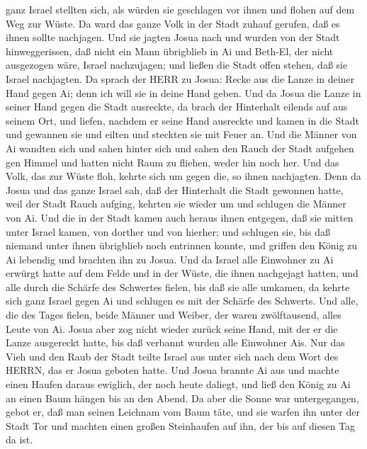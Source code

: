 ganz Israel stellten sich, als würden sie geschlagen vor ihnen und
flohen auf dem Weg zur Wüste.  Da ward das ganze Volk in
der Stadt zuhauf gerufen, daß es ihnen sollte nachjagen. 
Und sie jagten Josua nach und wurden von der Stadt hinweggerissen, daß
nicht ein Mann übrigblieb in Ai und Beth-El, der nicht ausgezogen wäre,
Israel nachzujagen; und ließen die Stadt offen stehen, daß sie Israel
nachjagten.  Da sprach der HERR zu Josua: Recke aus die
Lanze in deiner Hand gegen Ai; denn ich will sie in deine Hand geben.
Und da Josua die Lanze in seiner Hand gegen die Stadt ausreckte,
 da brach der Hinterhalt eilends auf aus seinem Ort, und
liefen, nachdem er seine Hand ausreckte und kamen in die Stadt und
gewannen sie und eilten und steckten sie mit Feuer an.  Und
die Männer von Ai wandten sich und sahen hinter sich und sahen den Rauch
der Stadt aufgehen gen Himmel und hatten nicht Raum zu fliehen, weder
hin noch her. Und das Volk, das zur Wüste floh, kehrte sich um gegen
die, so ihnen nachjagten.  Denn da Josua und das ganze
Israel sah, daß der Hinterhalt die Stadt gewonnen hatte, weil der Stadt
Rauch aufging, kehrten sie wieder um und schlugen die Männer von Ai.
 Und die in der Stadt kamen auch heraus ihnen entgegen, daß
sie mitten unter Israel kamen, von dorther und von hierher; und schlugen
sie, bis daß niemand unter ihnen übrigblieb noch entrinnen konnte,
 und griffen den König zu Ai lebendig und brachten ihn zu
Josua.  Und da Israel alle Einwohner zu Ai erwürgt hatte
auf dem Felde und in der Wüste, die ihnen nachgejagt hatten, und alle
durch die Schärfe des Schwertes fielen, bis daß sie alle umkamen, da
kehrte sich ganz Israel gegen Ai und schlugen es mit der Schärfe des
Schwerts.  Und alle, die des Tages fielen, beide Männer und
Weiber, der waren zwölftausend, alles Leute von Ai.  Josua
aber zog nicht wieder zurück seine Hand, mit der er die Lanze ausgereckt
hatte, bis daß verbannt wurden alle Einwohner Ais.  Nur das
Vieh und den Raub der Stadt teilte Israel aus unter sich nach dem Wort
des HERRN, das er Josua geboten hatte.  Und Josua brannte
Ai aus und machte einen Haufen daraus ewiglich, der noch heute daliegt,
 und ließ den König zu Ai an einen Baum hängen bis an den
Abend. Da aber die Sonne war untergegangen, gebot er, daß man seinen
Leichnam vom Baum täte, und sie warfen ihn unter der Stadt Tor und
machten einen großen Steinhaufen auf ihn, der bis auf diesen Tag da ist.
